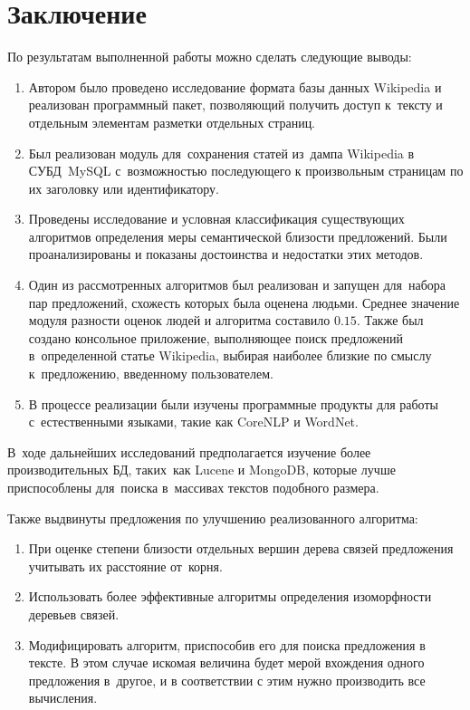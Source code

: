 \section{Заключение}

По результатам выполненной работы можно сделать следующие выводы:

\begin{enumerate}
\item {
Автором было проведено исследование формата базы данных Wikipedia
и реализован программный пакет, позволяющий получить доступ к~тексту
и отдельным элементам разметки отдельных страниц.
}
\item {
Был реализован модуль для~сохранения статей из~дампа Wikipedia
в СУБД~MySQL с~возможностью последующего к произвольным страницам
по их заголовку или идентификатору. 
}
\item {
Проведены исследование и условная классификация существующих 
алгоритмов определения меры семантической близости предложений. 
Были проанализированы и показаны достоинства и недостатки этих методов.
}
\item {
Один из рассмотренных алгоритмов был реализован и запущен для~набора 
пар предложений, схожесть которых была оценена людьми. 
Среднее значение модуля разности оценок людей и алгоритма составило $0.15$.
Также был создано консольное приложение, выполняющее поиск предложений 
в~определенной статье Wikipedia, выбирая наиболее близкие по смыслу
к~предложению, введенному пользователем.
}
\item {
В процессе реализации были изучены программные продукты для работы
с~естественными языками, такие как CoreNLP и WordNet.
} 
\end{enumerate}

В~ходе дальнейших исследований предполагается изучение более производительных БД, таких~как 
Lucene и MongoDB, которые лучше приспособлены для~поиска в~массивах текстов подобного размера.

Также выдвинуты предложения по улучшению реализованного алгоритма:
\begin{enumerate}
\item{
При оценке степени близости отдельных вершин дерева связей предложения учитывать 
их расстояние от~корня.
}
\item{
Использовать более эффективные алгоритмы определения изоморфности деревьев связей.
}
\item{
Модифицировать алгоритм, приспособив его для поиска предложения в тексте.
В этом случае искомая величина будет мерой вхождения одного предложения в~другое,
и в соответствии с этим нужно производить все вычисления.
}
\end{enumerate}



